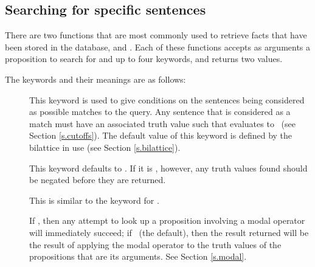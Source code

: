 \subsection{Searching for specific sentences}

There are two functions that are most commonly used to retrieve facts
that have been stored in the database,  and
.  Each of these functions accepts as arguments a
proposition to search for and up to four keywords, and returns two
values.

The keywords and their meanings are as follows:
 \begin{description}
 \item [] This keyword is used to give conditions on
the sentences being considered as possible matches to the query.  Any
sentence that is considered as a match must have an associated truth
value  such that  evaluates to \T\ (see
Section \ref{s.cutoffs}).  The default value of this keyword is defined
by the bilattice in use (see Section \ref{s.bilattice}).
 \item [] This keyword defaults to \NIL.  If it is \T,
however, any truth values found should be negated before they are
returned.
 \item [\apa] This is similar to the keyword for .
 \item [] If \T, then any attempt to look
up a proposition involving a modal operator will immediately succeed;
if \NIL\ (the default), then the result returned will be the result
of applying the modal operator to the truth values of the
propositions that are its arguments.  See Section \ref{s.modal}.
 \end{description}

